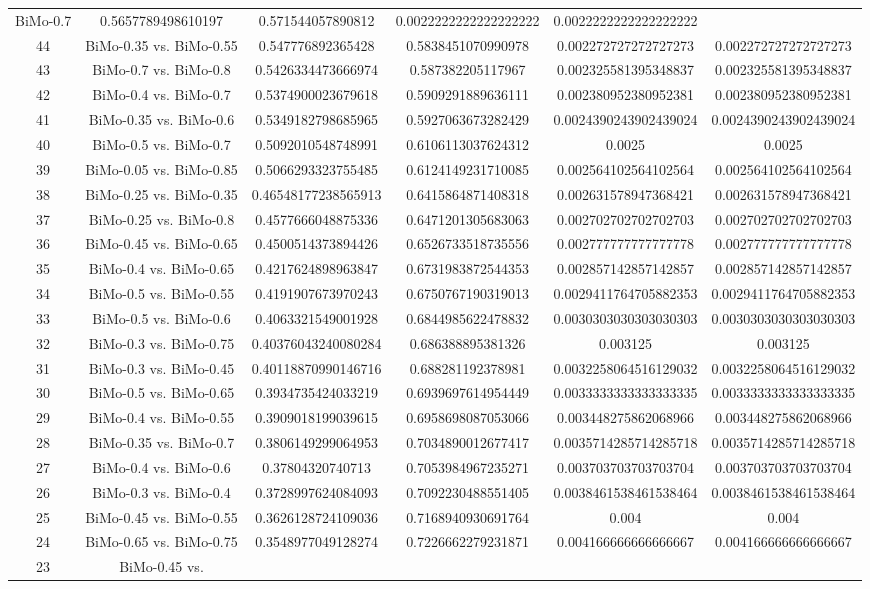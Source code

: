 \documentclass[a4paper,10pt]{article}
\begin{document}
\begin{landscape}
\begin{table}[!htp]
\begin{tabular}{cccccc}
BiMo-0.7&0.5657789498610197&0.571544057890812&0.0022222222222222222&0.0022222222222222222\\44&BiMo-0.35 vs. BiMo-0.55&0.547776892365428&0.5838451070990978&0.002272727272727273&0.002272727272727273\\43&BiMo-0.7 vs. BiMo-0.8&0.5426334473666974&0.587382205117967&0.002325581395348837&0.002325581395348837\\42&BiMo-0.4 vs. BiMo-0.7&0.5374900023679618&0.5909291889636111&0.002380952380952381&0.002380952380952381\\41&BiMo-0.35 vs. BiMo-0.6&0.5349182798685965&0.5927063673282429&0.0024390243902439024&0.0024390243902439024\\40&BiMo-0.5 vs. BiMo-0.7&0.5092010548748991&0.6106113037624312&0.0025&0.0025\\39&BiMo-0.05 vs. BiMo-0.85&0.5066293323755485&0.6124149231710085&0.002564102564102564&0.002564102564102564\\38&BiMo-0.25 vs. BiMo-0.35&0.46548177238565913&0.6415864871408318&0.002631578947368421&0.002631578947368421\\37&BiMo-0.25 vs. BiMo-0.8&0.4577666048875336&0.6471201305683063&0.002702702702702703&0.002702702702702703\\36&BiMo-0.45 vs. BiMo-0.65&0.4500514373894426&0.6526733518735556&0.002777777777777778&0.002777777777777778\\35&BiMo-0.4 vs. BiMo-0.65&0.4217624898963847&0.6731983872544353&0.002857142857142857&0.002857142857142857\\34&BiMo-0.5 vs. BiMo-0.55&0.4191907673970243&0.6750767190319013&0.0029411764705882353&0.0029411764705882353\\33&BiMo-0.5 vs. BiMo-0.6&0.4063321549001928&0.6844985622478832&0.0030303030303030303&0.0030303030303030303\\32&BiMo-0.3 vs. BiMo-0.75&0.40376043240080284&0.686388895381326&0.003125&0.003125\\31&BiMo-0.3 vs. BiMo-0.45&0.40118870990146716&0.688281192378981&0.0032258064516129032&0.0032258064516129032\\30&BiMo-0.5 vs. BiMo-0.65&0.3934735424033219&0.6939697614954449&0.0033333333333333335&0.0033333333333333335\\29&BiMo-0.4 vs. BiMo-0.55&0.3909018199039615&0.6958698087053066&0.003448275862068966&0.003448275862068966\\28&BiMo-0.35 vs. BiMo-0.7&0.3806149299064953&0.7034890012677417&0.0035714285714285718&0.0035714285714285718\\27&BiMo-0.4 vs. BiMo-0.6&0.37804320740713&0.7053984967235271&0.003703703703703704&0.003703703703703704\\26&BiMo-0.3 vs. BiMo-0.4&0.3728997624084093&0.7092230488551405&0.0038461538461538464&0.0038461538461538464\\25&BiMo-0.45 vs. BiMo-0.55&0.3626128724109036&0.7168940930691764&0.004&0.004\\24&BiMo-0.65 vs. BiMo-0.75&0.3548977049128274&0.7226662279231871&0.004166666666666667&0.004166666666666667\\23&BiMo-0.45 vs. 
\end{tabular}
\end{table}
\end{landscape}
\end{document}
